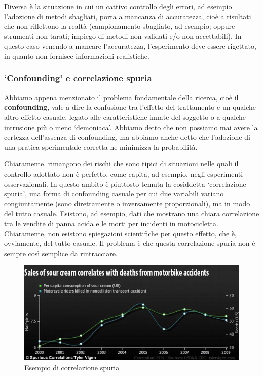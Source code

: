 \documentclass[a4paper,12pt,oneside]{book}
\theoremstyle{definition}
\theoremstyle{definition}
\theoremstyle{definition}
\theoremstyle{remark}
\begin{document}
Diversa è la situazione in cui un cattivo controllo degli errori, ad
esempio l'adozione di metodi sbagliati, porta a mancanza di accuratezza,
cioè a risultati che non riflettono la realtà (campionamento sbagliato,
ad esempio; oppure strumenti non tarati; impiego di metodi non validati
e/o non accettabili). In questo caso venendo a mancare l'accuratezza,
l'esperimento deve essere rigettato, in quanto non fornisce informazioni
realistiche.

\subsubsection{\texorpdfstring{`Confounding' e correlazione
spuria}{Confounding e correlazione spuria}}\label{confounding-e-correlazione-spuria}

Abbiamo appena menzionato il problema fondamentale della ricerca, cioè
il \textbf{confounding}, vale a dire la confusione tra l'effetto del
trattamento e un qualche altro effetto casuale, legato alle
caratteristiche innate del soggetto o a qualche intrusione più o meno
`demoniaca'. Abbiamo detto che non possiamo mai avere la certezza
dell'assenza di confounding, ma abbiamo anche detto che l'adozione di
una pratica sperimentale corretta ne minimizza la probabilità.

Chiaramente, rimangono dei rischi che sono tipici di situazioni nelle
quali il controllo adottato non è perfetto, come capita, ad esempio,
negli esperimenti osservazionali. In questo ambito è piuttosto temuta la
cosiddetta `correlazione spuria', una forma di confounding casuale per
cui due variabili variano congiuntamente (sono direttamente o
inversamente proporzionali), ma in modo del tutto casuale. Esistono, ad
esempio, dati che mostrano una chiara correlazione tra le vendite di
panna acida e le morti per incidenti in motocicletta. Chiaramente, non
esistono spiegazioni scientifiche per questo effetto, che è, ovviamente,
del tutto casuale. Il problema è che questa correlazione spuria non è
sempre così semplice da rintracciare.

\begin{figure}

{\centering \includegraphics[width=0.9\linewidth]{_images/PannaAcida} 

}

\caption{Esempio di correlazione spuria}\label{fig:figName22}
\end{figure}
\end{document}

